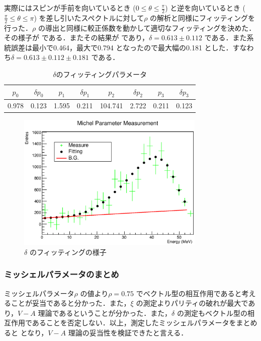 実際にはスピンが手前を向いているとき ($0\leq\theta\leq\frac{\pi}{2}$) と逆を向いているとき ($\frac{\pi}{2}\leq\theta\leq\pi$) を差し引いたスペクトルに対して$\rho$ の解析と同様にフィッティングを行った．$\rho$ の導出と同様に較正係数を動かして適切なフィッティングを決めた．その様子が である．またその結果が であり，$\delta=0.613\pm0.112$ である．また系統誤差は最小で0.464，最大で0.794 となったので最大幅の0.181 とした．すなわち$\delta=0.613\pm0.112\pm0.181$ である．
\begin{table}[bht]
\centering
\caption{$\delta$のフィッティングパラメータ}
\begin{tabular}{cccccccc}
$p_0$ & $\delta p_0$ & $p_1$ & $\delta p_1$ & $p_2$ & $\delta p_2$ & $p_3$ & $\delta p_3$ \\ \hline
0.978 & 0.123 & 1.595 & 0.211 & 104.741 & 2.722 & 0.211 & 0.123 \\
\end{tabular}
\label{hatano_tab:delta}
\end{table}

\begin{figure}[bht]
\centering
\includegraphics[width=0.8\textwidth]{figure/hatano/delta.eps}
\caption{$\delta$ のフィッティングの様子}
\label{hatano_fig:delta}
\end{figure}

\subsubsection{ミッシェルパラメータのまとめ}
ミッシェルパラメータ$\rho$ の値より$\rho=0.75$ でベクトル型の相互作用であると考えることが妥当であると分かった．また，$\xi$ の測定よりパリティの破れが最大であり，$V - A$ 理論であるということが分かった．また，$\delta$ の測定もベクトル型の相互作用であることを否定しない．以上，測定したミッシェルパラメータをまとめると となり，$V - A$ 理論の妥当性を検証できたと言える．

